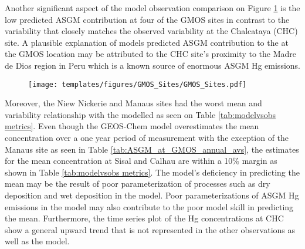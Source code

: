 


\begin{flushleft}
Another significant aspect of the model observation comparison on Figure \ref{fig:GMOSvsGC} is the low predicted ASGM contribution at  four of the GMOS sites in contrast to the variability that closely matches the observed variability at the Chalcataya (CHC) site. A plausible explanation of models predicted ASGM contribution to the \hg at the GMOS location may be attributed to the CHC site's proximity to the Madre de Dios region in Peru which is a known source of enormous ASGM Hg emissions. 
\end{flushleft}

\begin{figure}[H]
\texttt{[image: templates/figures/GMOS\_Sites/GMOS\_Sites.pdf]}
\centering
{}
\label{fig:GMOSvsGC}
\end{figure}
\FloatBarrier

\begin{flushleft}
Moreover, the Niew Nickerie and Manaus sites had the worst mean and variability relationship with the modelled \hg as seen on Table \ref{tab:modelvsobs metrics}. Even though the GEOS-Chem model overestimates the mean concentration over a one year period of measurement with the exception of the Manaus site as seen in Table \ref{tab:ASGM_at_GMOS_annual_avs}, the estimates for the mean concentration at Sisal and Calhau are within a 10\% margin as shown in Table \ref{tab:modelvsobs metrics}. The model's deficiency in predicting the mean may be the result of poor parameterization of processes such as dry deposition and wet deposition in the model. Poor parameterizations of ASGM Hg emissions in the model may also  contribute to the poor model skill in predicting the mean. Furthermore, the time series plot of the Hg concentrations at CHC show a general upward trend that is not represented in the other observations as well as the model. 
\end{flushleft}


\begin{flushleft}
  
\end{flushleft}

